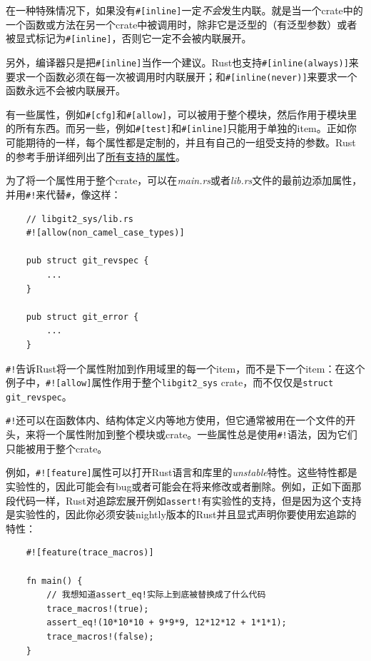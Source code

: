 在一种特殊情况下，如果没有\texttt{\#[inline]}一定\emph{不会}发生内联。就是当一个crate中的一个函数或方法在另一个crate中被调用时，除非它是泛型的（有泛型参数）或者被显式标记为\texttt{\#[inline]}，否则它一定不会被内联展开。

另外，编译器只是把\texttt{\#[inline]}当作一个建议。Rust也支持\texttt{\#[inline(always)]}来要求一个函数必须在每一次被调用时内联展开；和\texttt{\#[inline(never)]}来要求一个函数永远不会被内联展开。

有一些属性，例如\texttt{\#[cfg]}和\texttt{\#[allow]}，可以被用于整个模块，然后作用于模块里的所有东西。而另一些，例如\texttt{\#[test]}和\texttt{\#[inline]}只能用于单独的item。正如你可能期待的一样，每个属性都是定制的，并且有自己的一组受支持的参数。Rust的参考手册详细列出了\href{https://doc.rust-lang.org/reference/attributes.html}{所有支持的属性}。

为了将一个属性用于整个crate，可以在\emph{main.rs}或者\emph{lib.rs}文件的最前边添加属性，并用\texttt{\#!}来代替\texttt{\#}，像这样：
\begin{verbatim}
    // libgit2_sys/lib.rs
    #![allow(non_camel_case_types)]

    pub struct git_revspec {
        ...
    }

    pub struct git_error {
        ...
    }
\end{verbatim}

\texttt{\#!}告诉Rust将一个属性附加到作用域里的每一个item，而不是下一个item：在这个例子中，\texttt{\#![allow]}属性作用于整个\texttt{libgit2\_sys} crate，而不仅仅是\texttt{struct git\_revspec}。

\texttt{\#!}还可以在函数体内、结构体定义内等地方使用，但它通常被用在一个文件的开头，来将一个属性附加到整个模块或crate。一些属性总是使用\texttt{\#!}语法，因为它们只能被用于整个crate。

例如，\texttt{\#![feature]}属性可以打开Rust语言和库里的\emph{unstable}特性。这些特性都是实验性的，因此可能会有bug或者可能会在将来修改或者删除。例如，正如下面那段代码一样，Rust对追踪宏展开例如\texttt{assert!}有实验性的支持，但是因为这个支持是实验性的，因此你必须安装nightly版本的Rust并且显式声明你要使用宏追踪的特性：
\begin{verbatim}
    #![feature(trace_macros)]
    
    fn main() {
        // 我想知道assert_eq!实际上到底被替换成了什么代码
        trace_macros!(true);
        assert_eq!(10*10*10 + 9*9*9, 12*12*12 + 1*1*1);
        trace_macros!(false);
    }
\end{verbatim}

